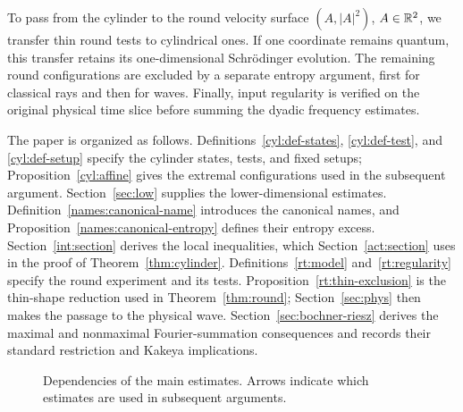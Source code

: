 To pass from the cylinder to the round velocity surface $(A,|A|^2)$,
$A\in\mathbb R^2$, we transfer thin round tests to cylindrical ones. If one
coordinate remains quantum, this transfer retains its one-dimensional
Schr\"odinger evolution. The remaining round configurations are excluded
by a separate entropy argument, first for classical rays and then for
waves. Finally, input regularity is verified on the original physical
time slice before summing the dyadic frequency estimates.

The paper is organized as follows.
Definitions~\ref{cyl:def-states}, \ref{cyl:def-test}, and
\ref{cyl:def-setup} specify the cylinder states, tests, and fixed
setups; Proposition~\ref{cyl:affine} gives the
extremal configurations used in the subsequent argument.
Section~\ref{sec:low} supplies the lower-dimensional estimates.
Definition~\ref{names:canonical-name} introduces the canonical names,
and Proposition~\ref{names:canonical-entropy} defines their entropy
excess. Section~\ref{int:section} derives the local inequalities,
which Section~\ref{act:section} uses in the proof of
Theorem~\ref{thm:cylinder}.
Definitions~\ref{rt:model} and~\ref{rt:regularity} specify the round
experiment and its tests. Proposition~\ref{rt:thin-exclusion} is the
thin-shape reduction used in Theorem~\ref{thm:round};
Section~\ref{sec:phys} then makes the passage to the physical wave.
Section~\ref{sec:bochner-riesz} derives the maximal and nonmaximal
Fourier-summation consequences and records their standard restriction
and Kakeya implications.

\begin{figure}[!htb]
\centering
{}
\caption{Dependencies of the main estimates. Arrows indicate which
estimates are used in subsequent arguments.}
\label{fig:dependencies}
\end{figure}

